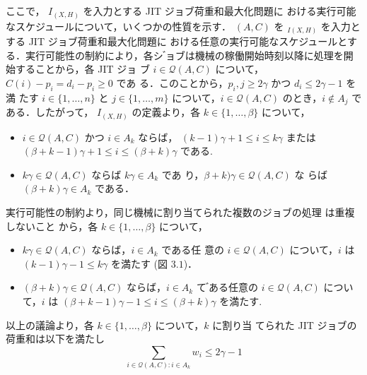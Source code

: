 \documentclass[12pt]{optlab-bachelor}
\begin{document}
ここで， $I_{(X,H)}$ を入力とする JIT ジョブ荷重和最大化問題に
おける実行可能なスケジュールについて，いくつかの性質を示す．
$(A, C)$ を $_{I(X,H)}$ を入力とする JIT ジョブ荷重和最大化問題に
おける任意の実行可能なスケジュールとする．実行可能性の制約により，各シ
゙ョブは機械の稼働開始時刻以降に処理を開始することから，各 JIT ジョ
ブ $i \in \mathcal{Q}(A,C)$ について，$C(i) − p_i = d_i − p_i \ge 0$ であ
る．このことから，$p_i,j \ge 2\gamma$ かつ $d_i \le 2\gamma − 1$ を満
たす $i \in \{1,\ldots,n\}$ と $j \in \{1,\ldots,m\}$ について，$i \in
\mathcal{Q}(A,C)$ のとき，$i \notin A_j$ である．したがって，
$I_{(X,H)}$ の定義より，各 $k \in \{1,\ldots,\beta\}$ について，
\begin{itemize}
  \item $i \in \mathcal{Q}(A,C)$ かつ $i \in A_k$ ならば，
  $(k − 1)\gamma + 1 \le i \le k\gamma$ または $(\beta + k − 1)\gamma +
  1 \le i \le (\beta + k)\gamma$ である.
  \item $k\gamma \in \mathcal{Q}(A,C)$ ならば $k\gamma \in A_k$ であ
  り，$\beta + k)\gamma \in \mathcal{Q}(A,C)$ な
  らば $(\beta + k)\gamma \in A_k$ である．
\end{itemize}
実行可能性の制約より，同じ機械に割り当てられた複数のジョブの処理
は重複しないこと から，各 $k \in \{1,\ldots,\beta\}$ について，
\begin{itemize}
  \item $k\gamma \in \mathcal{Q}(A,C)$ ならば，$i \in A_k$ である任
  意の $i \in \mathcal{Q}(A,C)$ について，$i$ は \\$(k − 1)\gamma− 1
  \le k\gamma$ を満たす (図 $3.1$)．
  \item $(\beta + k)\gamma \in \mathcal{Q}(A,C)$ ならば，$i \in A_k$ て
  ゙ある任意の $i \in \mathcal{Q}(A,C)$ について，$i$ は
  $(\beta + k − 1)\gamma − 1 \le i \le (\beta + k)\gamma$ を満たす.
\end{itemize}
以上の議論より，各 $k \in \{1,\ldots, \beta \}$ について，$k$ に割り当
てられた JIT ジョブの荷重和は以下を満たし
\begin{equation}
  \sum_{i \in \mathcal{Q}(A,C):i \in A_k}w_i \le
  2\gamma - 1 \tag{A.1}
\end{equation}
\end{document}
